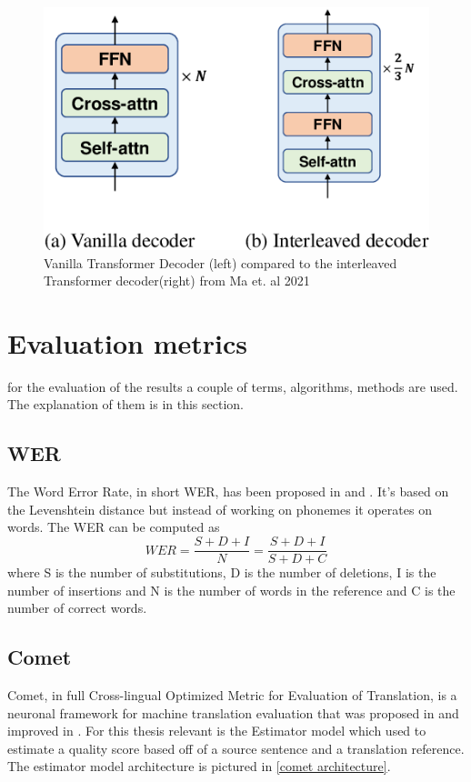 \begin{figure}
    \centering%
    \includegraphics[width=0.5\linewidth]{Latex/sections/images/interleaveddecoder.png}
    \caption{Vanilla Transformer Decoder (left) compared to the interleaved Transformer decoder(right) from Ma et. al 2021}
    \label{fig:interleaved decoder}
\end{figure}



\section{Evaluation metrics}
 for the evaluation of the results a couple of terms, algorithms, methods are used. The explanation of them is in this section. 
 
\subsection{WER}
\label{wer}
The Word Error Rate, in short WER, has been proposed in \cite{woodard1982} and \cite{morris2004}.
It's based on the Levenshtein distance but instead of working on phonemes it operates on words.
The WER can be computed as $$WER=\frac{S+D+I}{N}=\frac{S+D+I}{S+D+C}$$ where S is the number of substitutions, D is the number of deletions, I is the number of insertions and N is the number of words in the reference and C is the number of correct words.

\subsection{Comet}
Comet, in full Cross-lingual Optimized Metric for Evaluation of Translation, is a neuronal framework for machine translation evaluation that was proposed in \cite{rei-etal-2020-comet} and improved in \cite{rei-etal-2022-comet}.
For this thesis relevant is the Estimator model which used to estimate a quality score based off of a source sentence and a translation reference. The estimator model architecture is pictured in \autoref{comet architecture}.

